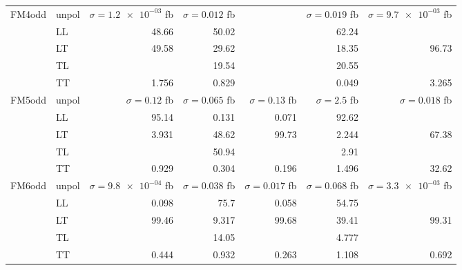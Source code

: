 \begin{table}[h]
{\begin{tabular}{llrrrrr}
\midrule
\multirow{5}{*}{FM4odd}
 & unpol & $\sigma = \num{1.2e-03}$ fb & $\sigma = \num{0.012}$ fb &  & $\sigma = \num{0.019}$ fb & $\sigma = \num{9.7e-03}$ fb \\
 & LL & \num{48.66} & \num{50.02} &  & \num{62.24} &  \\
 & LT & \num{49.58} & \num{29.62} &  & \num{18.35} & \num{96.73} \\
 & TL &  & \num{19.54} &  & \num{20.55} &  \\
 & TT & \num{1.756} & \num{0.829} &  & \num{0.049} & \num{3.265} \\
\midrule
\multirow{5}{*}{FM5odd}
 & unpol & $\sigma = \num{0.12}$ fb & $\sigma = \num{0.065}$ fb & $\sigma = \num{0.13}$ fb & $\sigma = \num{2.5}$ fb & $\sigma = \num{0.018}$ fb \\
 & LL & \num{95.14} & \num{0.131} & \num{0.071} & \num{92.62} &  \\
 & LT & \num{3.931} & \num{48.62} & \num{99.73} & \num{2.244} & \num{67.38} \\
 & TL &  & \num{50.94} &  & \num{2.91} &  \\
 & TT & \num{0.929} & \num{0.304} & \num{0.196} & \num{1.496} & \num{32.62} \\
\midrule
\multirow{5}{*}{FM6odd}
 & unpol & $\sigma = \num{9.8e-04}$ fb & $\sigma = \num{0.038}$ fb & $\sigma = \num{0.017}$ fb & $\sigma = \num{0.068}$ fb & $\sigma = \num{3.3e-03}$ fb \\
 & LL & \num{0.098} & \num{75.7} & \num{0.058} & \num{54.75} &  \\
 & LT & \num{99.46} & \num{9.317} & \num{99.68} & \num{39.41} & \num{99.31} \\
 & TL &  & \num{14.05} &  & \num{4.777} &  \\
 & TT & \num{0.444} & \num{0.932} & \num{0.263} & \num{1.108} & \num{0.692} \\
\bottomrule
\end{tabular}
}%
\end{table}
\newpage
